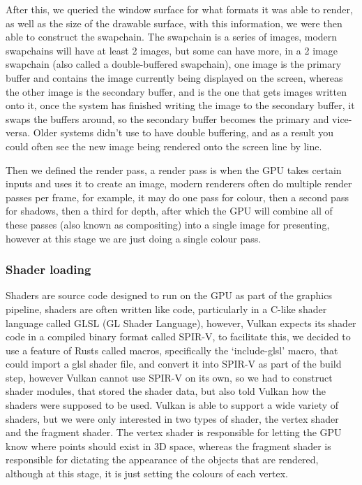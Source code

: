 \documentclass[../report.tex]{subfiles}
\begin{document}
After this, we queried the window surface for what formats it was able to render, as well as the size of the drawable surface,
with this information, we were then able to construct the swapchain.
The swapchain is a series of images, modern swapchains will have at least 2 images, but some can have more, in a 2 image swapchain (also called a double-buffered swapchain), one image is the primary buffer and contains the image currently being displayed on the screen, whereas the other image is the secondary buffer, and is the one that gets images written onto it, once the system has finished writing the image to the secondary buffer, it swaps the buffers around, so the secondary buffer becomes the primary and vice-versa. Older systems didn't use to have double buffering, and as a result you could often see the new image being rendered onto the screen line by line.

Then we defined the render pass, a render pass is when the GPU takes certain inputs and uses it to create an image, modern renderers often do multiple render passes per frame, for example, it may do one pass for colour, then a second pass for shadows, then a third for depth, after which the GPU will combine all of these passes (also known as compositing) into a single image for presenting, however at this stage we are just doing a single colour pass.

\subsubsection{Shader loading}
Shaders are source code designed to run on the GPU as part of the graphics pipeline, shaders are often written like code, particularly in a C-like shader language called GLSL (GL Shader Language), however, Vulkan expects its shader code in a compiled binary format called SPIR-V, to facilitate this, we decided to use a feature of Rusts called macros, specifically the `include-glsl' macro, that could import a glsl shader file, and convert it into SPIR-V as part of the build step, however Vulkan cannot use SPIR-V on its own, so we had to construct shader modules, that stored the shader data, but also told Vulkan how the shaders were supposed to be used.
Vulkan is able to support a wide variety of shaders, but we were only interested in two types of shader, the vertex shader and the fragment shader.
The vertex shader is responsible for letting the GPU know where points should exist in 3D space, whereas the fragment shader is responsible for dictating the appearance of the objects that are rendered, although at this stage, it is just setting the colours of each vertex.
\end{document}
